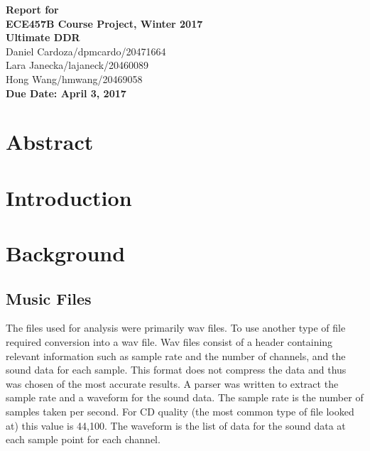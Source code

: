 \documentclass[12pt]{article}
\begin{document}
\begin{center}
{\Large\bf Report for}\\
\vspace{1mm}
{\Large\bf ECE457B Course Project, Winter 2017}\\
\vspace{2mm}
{\Large\bf Ultimate DDR}\\
\vspace{4mm}
{Daniel Cardoza/dpmcardo/20471664}\\
{Lara Janecka/lajaneck/20460089}\\
{Hong Wang/hmwang/20469058}\\
\vspace{2mm}
\textbf{Due Date: April 3, 2017}
\end{center}

\def\question#1{\item[\bf #1.]}
\def\part#1{\item[\bf #1)]}
\newcommand{\pc}[1]{\mbox{\textbf{#1}}} %

\section{Abstract}

\pagebreak

\section{Introduction}

\pagebreak


\section{Background}
\subsection{Music Files}
The files used for analysis were primarily wav files. To use another type of file required conversion into a wav file. Wav files consist of a header containing relevant information such as sample rate and the number of channels, and the sound data for each sample. This format does not compress the data and thus was chosen of the most accurate results. A parser was written to extract the sample rate and a waveform for the sound data. The sample rate is the number of samples taken per second. For CD quality (the most common type of file looked at) this value is 44,100. The waveform is the list of data for the sound data at each sample point for each channel.
\end{document}
